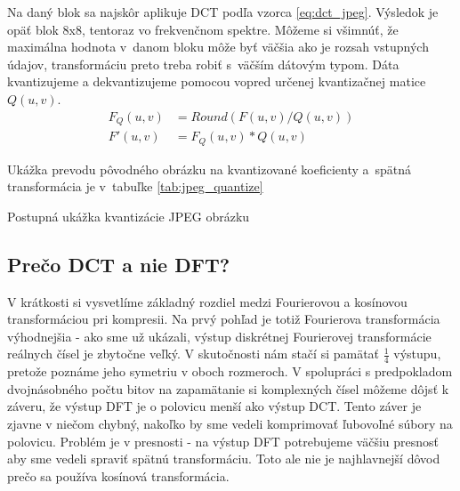Na daný blok sa najskôr aplikuje DCT podľa vzorca \ref{eq:dct_jpeg}.
Výsledok je opäť blok 8x8,
tentoraz vo frekvenčnom spektre. Môžeme si všimnúť, že maximálna
hodnota v~danom bloku môže byť väčšia ako je rozsah vstupných údajov,
transformáciu preto treba robiť s~väčším dátovým typom.
Dáta kvantizujeme a dekvantizujeme pomocou vopred určenej kvantizačnej matice $Q(u,v)$.
\begin{align*}
    F_Q(u,v) &= Round (F(u,v)/Q(u,v)) \\
    F'(u,v) &= F_Q(u,v) * Q(u,v)
\end{align*}

Ukážka prevodu pôvodného obrázku na kvantizované koeficienty 
a~spätná transformácia je v~tabuľke \ref{tab:jpeg_quantize}

\begin{table}[htb]
    \centering

    \subtable[DCT]{
    \tiny
    
    }

    \subtable[Po kvantizácii]{
    \tiny
    
    }
    
    \subtable[Dekvantizácia]{
    \tiny
    
    }
    
    
    \caption{Postupná ukážka kvantizácie JPEG obrázku}
    \label{tab:jpeg_quantize}
\end{table}

\subsection{Prečo DCT a nie DFT?}
 V krátkosti si vysvetlíme základný rozdiel medzi Fourierovou a
 kosínovou transformáciou pri kompresii. Na prvý pohľad je totiž
 Fourierova transformácia výhodnejšia - ako sme už ukázali, výstup
 diskrétnej Fourierovej transformácie reálnych čísel je zbytočne
 veľký. V skutočnosti nám stačí si pamätať $\frac{1}{4}$ výstupu, pretože
 poznáme jeho symetriu v oboch rozmeroch. V spolupráci s predpokladom
 dvojnásobného počtu bitov na zapamätanie si komplexných čísel môžeme
 dôjsť k záveru, že výstup DFT je o polovicu menší ako výstup DCT.
 Tento záver je zjavne v niečom chybný, nakoľko by sme vedeli
 komprimovať ľubovoľné súbory na polovicu. Problém je v  presnosti -
 na výstup DFT potrebujeme väčšiu presnosť aby sme vedeli spraviť
 spätnú transformáciu. Toto ale nie je najhlavnejší dôvod prečo sa
 používa kosínová transformácia.


